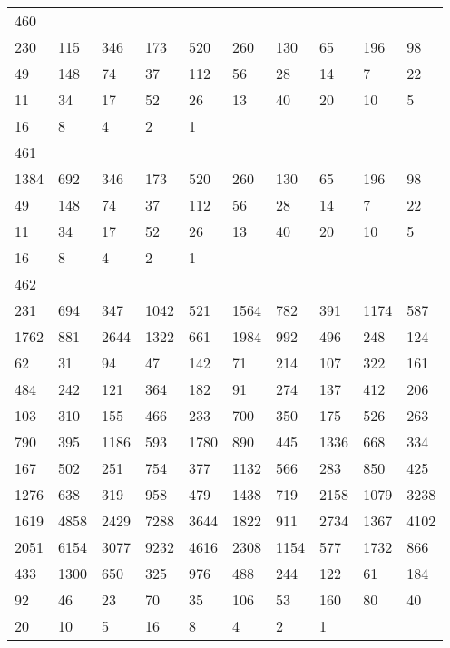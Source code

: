 \begin{longtable}{*{10}{l}}
460&&&&&&&&&\\
230& 115& 346& 173& 520& 260& 130& 65& 196& 98\\
49& 148& 74& 37& 112& 56& 28& 14& 7& 22\\
11& 34& 17& 52& 26& 13& 40& 20& 10& 5\\
16& 8& 4& 2& 1& \\

461&&&&&&&&&\\
1384& 692& 346& 173& 520& 260& 130& 65& 196& 98\\
49& 148& 74& 37& 112& 56& 28& 14& 7& 22\\
11& 34& 17& 52& 26& 13& 40& 20& 10& 5\\
16& 8& 4& 2& 1& \\

462&&&&&&&&&\\
231& 694& 347& 1042& 521& 1564& 782& 391& 1174& 587\\
1762& 881& 2644& 1322& 661& 1984& 992& 496& 248& 124\\
62& 31& 94& 47& 142& 71& 214& 107& 322& 161\\
484& 242& 121& 364& 182& 91& 274& 137& 412& 206\\
103& 310& 155& 466& 233& 700& 350& 175& 526& 263\\
790& 395& 1186& 593& 1780& 890& 445& 1336& 668& 334\\
167& 502& 251& 754& 377& 1132& 566& 283& 850& 425\\
1276& 638& 319& 958& 479& 1438& 719& 2158& 1079& 3238\\
1619& 4858& 2429& 7288& 3644& 1822& 911& 2734& 1367& 4102\\
2051& 6154& 3077& 9232& 4616& 2308& 1154& 577& 1732& 866\\
433& 1300& 650& 325& 976& 488& 244& 122& 61& 184\\
92& 46& 23& 70& 35& 106& 53& 160& 80& 40\\
20& 10& 5& 16& 8& 4& 2& 1& \\


\end{longtable}
